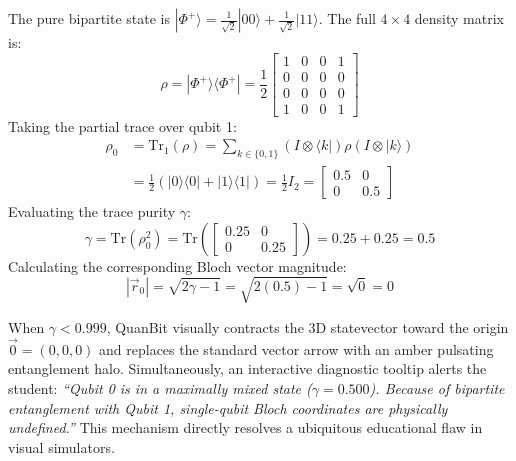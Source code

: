 \documentclass[conference]{IEEEtran}
\begin{document}
\begin{IEEEproof}
The pure bipartite state is $|\Phi^+\rangle = \frac{1}{\sqrt{2}}|00\rangle + \frac{1}{\sqrt{2}}|11\rangle$. The full $4 \times 4$ density matrix is:
\begin{equation}
\rho = |\Phi^+\rangle\langle\Phi^+| = \frac{1}{2}\begin{bmatrix} 1 & 0 & 0 & 1 \\ 0 & 0 & 0 & 0 \\ 0 & 0 & 0 & 0 \\ 1 & 0 & 0 & 1 \end{bmatrix}
\end{equation}
Taking the partial trace over qubit 1:
\begin{align}
\rho_0 &= \text{Tr}_1(\rho) = \sum_{k \in \{0, 1\}} (I \otimes \langle k|)\rho(I \otimes |k\rangle) \\
&= \frac{1}{2}(|0\rangle\langle 0| + |1\rangle\langle 1|) = \frac{1}{2}I_2 = \begin{bmatrix} 0.5 & 0 \\ 0 & 0.5 \end{bmatrix}
\end{align}
Evaluating the trace purity $\gamma$:
\begin{equation}
\gamma = \text{Tr}(\rho_0^2) = \text{Tr}\left( \begin{bmatrix} 0.25 & 0 \\ 0 & 0.25 \end{bmatrix} \right) = 0.25 + 0.25 = 0.5
\end{equation}
Calculating the corresponding Bloch vector magnitude:
\begin{equation}
|\vec{r}_0| = \sqrt{2\gamma - 1} = \sqrt{2(0.5) - 1} = \sqrt{0} = 0
\end{equation}
\end{IEEEproof}

When $\gamma < 0.999$, QuanBit visually contracts the 3D statevector toward the origin $\vec{0} = (0,0,0)$ and replaces the standard vector arrow with an amber pulsating entanglement halo. Simultaneously, an interactive diagnostic tooltip alerts the student: \textit{``Qubit 0 is in a maximally mixed state ($\gamma=0.500$). Because of bipartite entanglement with Qubit 1, single-qubit Bloch coordinates are physically undefined.''} This mechanism directly resolves a ubiquitous educational flaw in visual simulators.
\end{document}
